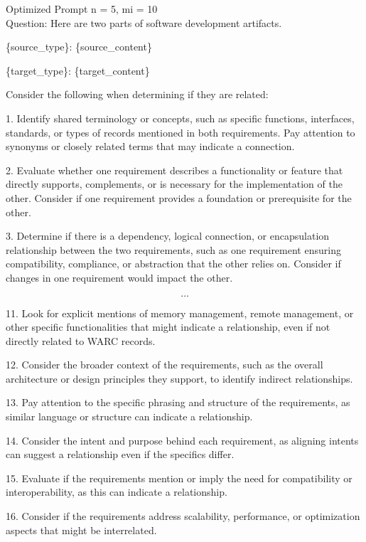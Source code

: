 \begin{prompt}{Optimized Prompt n = 5, mi = 10}\\
Question: Here are two parts of software development artifacts.

\{source\_type\}: \tripplequote\{source\_content\}\tripplequote

\{target\_type\}: \tripplequote\{target\_content\}\tripplequote

Consider the following when determining if they are related:

1. Identify shared terminology or concepts, such as specific functions, interfaces, standards, or types of records mentioned in both requirements. Pay attention to synonyms or closely related terms that may indicate a connection.

2. Evaluate whether one requirement describes a functionality or feature that directly supports, complements, or is necessary for the implementation of the other. Consider if one requirement provides a foundation or prerequisite for the other.

3. Determine if there is a dependency, logical connection, or encapsulation relationship between the two requirements, such as one requirement ensuring compatibility, compliance, or abstraction that the other relies on. Consider if changes in one requirement would impact the other.

\[\dots\]

11. Look for explicit mentions of memory management, remote management, or other specific functionalities that might indicate a relationship, even if not directly related to WARC records.

12. Consider the broader context of the requirements, such as the overall architecture or design principles they support, to identify indirect relationships.

13. Pay attention to the specific phrasing and structure of the requirements, as similar language or structure can indicate a relationship.

14. Consider the intent and purpose behind each requirement, as aligning intents can suggest a relationship even if the specifics differ.

15. Evaluate if the requirements mention or imply the need for compatibility or interoperability, as this can indicate a relationship.

16. Consider if the requirements address scalability, performance, or optimization aspects that might be interrelated.


\end{prompt}

